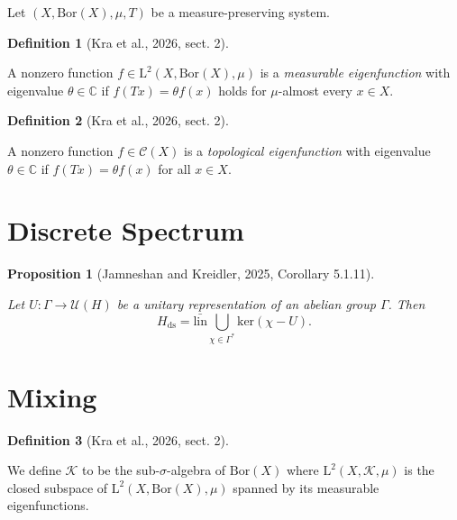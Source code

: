 \documentclass[
  british,
]{article}
\theoremstyle{plain}
\theoremstyle{plain}
\newtheorem{proposition}{Proposition}[section]
\theoremstyle{definition}
\newtheorem{definition}{Definition}[section]
\theoremstyle{remark}
\newcommand{\Borel}[1]{{\text{Bor}({#1})}}
\newcommand{\ContinuousFunctionSpace}[1]{{\mathscr{C}({#1})}}
\newcommand{\Dual}[1]{{#1}^{*}}
\newcommand{\Group}{{\Gamma}}
\newcommand{\HilbertSpace}{{H}}
\newcommand{\Measure}{{\mu}}
\newcommand{\SigmaAlgebra}[1]{{\mathscr{#1}}}
\newcommand{\EigenAlgebra}{{\SigmaAlgebra{K}}}
\begin{document}
Let \((X,\Borel{X},\Measure,T)\) be a measure-preserving system.

\begin{definition}[{Kra et al., 2026, sect.
2}]\protect\hypertarget{def-MeasurableEigenfunction}{}\label{def-MeasurableEigenfunction}

A nonzero function \(f\in\text{L}^2(X,\Borel{X},\Measure)\) is a
\emph{measurable eigenfunction} with eigenvalue \(\theta\in\mathbb{C}\)
if \(f(Tx)=\theta f(x)\) holds for \(\Measure\)-almost every \(x\in X\).

\end{definition}

\begin{definition}[{Kra et al., 2026, sect.
2}]\protect\hypertarget{def-TopologicalEigenfunction}{}\label{def-TopologicalEigenfunction}

A nonzero function \(f\in\ContinuousFunctionSpace{X}\) is a
\emph{topological eigenfunction} with eigenvalue \(\theta\in\mathbb{C}\)
if \(f(Tx)=\theta f(x)\) for all \(x\in X\).

\end{definition}

\section{Discrete Spectrum}\label{discrete-spectrum}

\begin{proposition}[{Jamneshan and Kreidler, 2025, Corollary
5.1.11}]\protect\hypertarget{prp-DiscreteSpectrum}{}\label{prp-DiscreteSpectrum}

Let \(U:\Group\rightarrow\mathscr{U}(\HilbertSpace)\) be a unitary
representation of an abelian group \(\Group\). Then \[
\HilbertSpace_\text{ds}=\bar{\text{lin}}\bigcup_{\chi\in\Dual{\Group}}\text{ker}(\chi-U).
\]

\end{proposition}

\section{Mixing}\label{mixing}

\begin{definition}[{Kra et al., 2026, sect.
2}]\protect\hypertarget{def-EigenAlgebra}{}\label{def-EigenAlgebra}

We define \(\EigenAlgebra\) to be the sub-\(\sigma\)-algebra of
\(\Borel{X}\) where \(\text{L}^2(X,\EigenAlgebra,\Measure)\) is the
closed subspace of \(\text{L}^2(X,\Borel{X},\Measure)\) spanned by its
measurable eigenfunctions.

\end{definition}
\end{document}
